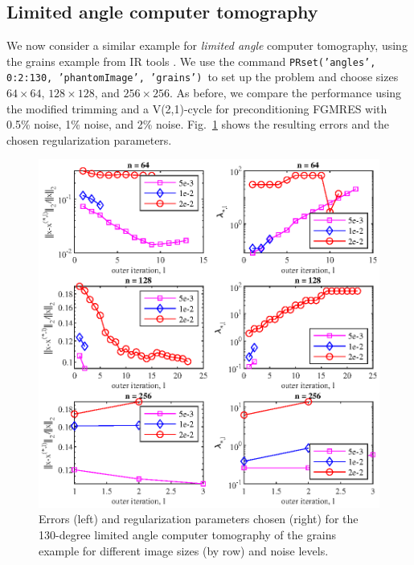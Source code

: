 \subsection{Limited angle computer tomography}
We now consider a similar example for \textit{limited angle} computer tomography, using the grains example from IR tools \cite{art:GAZZ19}. We use the command \texttt{PRset('angles', 0:2:130, 'phantomImage', 'grains')} to set up the problem and choose sizes $64 \times 64$, $128 \times 128$, and $256 \times 256$. As before, we compare the performance using the modified trimming and a V(2,1)-cycle for preconditioning FGMRES with 0.5\% noise, 1\% noise, and 2\% noise. Fig.~\ref{fig:limited_angle_grains_errs_and_reg_params} shows the resulting errors and the chosen regularization parameters.
\begin{figure}[htbp]
\begin{center}
\includegraphics{figures/limited_angle_grains_errs_and_reg_params}
\caption{Errors (left) and regularization parameters chosen (right) for the 130-degree limited angle computer tomography of the grains example for different image sizes (by row) and noise levels.}
\label{fig:limited_angle_grains_errs_and_reg_params}
\end{center}
\end{figure}

